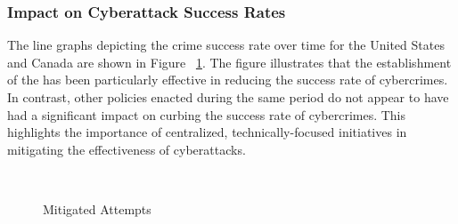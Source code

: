     \subsubsection*{Impact on Cyberattack Success Rates} %
        The line graphs depicting the crime success rate over time for the United States and Canada are shown in Figure
        ~\ref{fig:mitigated-attempts}.
        The figure illustrates that the establishment of the 
        has been particularly effective in reducing the success rate of cybercrimes.
        In contrast, other policies enacted during the same period do not appear to have had a significant impact
        on curbing the success rate of cybercrimes.
        This highlights the importance of centralized, technically-focused initiatives in mitigating the effectiveness of cyberattacks.
        \begin{figure}[htbp]
            \centering
            \hfill
            \\
            \caption{Mitigated Attempts}\label{fig:mitigated-attempts}
        \end{figure}

